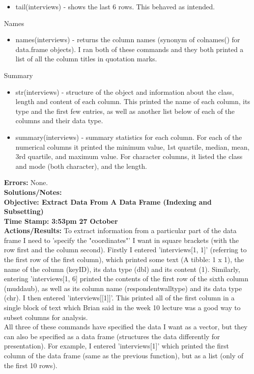 \documentclass{article}
\begin{document}
\begin{FlushLeft}
\begin{itemize}
    \item tail(interviews) - shows the last 6 rows. This behaved as intended.
\end{itemize}
Names
\begin{itemize}
    \item names(interviews) - returns the column names (synonym of colnames() for data.frame objects). I ran both of these commands and they both printed a list of all the column titles in quotation marks.
\end{itemize}
Summary
\begin{itemize}
    \item str(interviews) - structure of the object and information about the class, length and content of each column. This printed the name of each column, its type and the first few entries, as well as another list below of each of the columns and their data type.
    \item summary(interviews) - summary statistics for each column. For each of the numerical columns it printed the minimum value, 1st quartile, median, mean, 3rd quartile, and maximum value. For character columns, it listed the class and mode (both character), and the length.
\end{itemize}
\textbf{Errors:} None.\\
\textbf{Solutions/Notes:}\\
\vspace{5mm}
\textbf{Objective: Extract Data From A Data Frame (Indexing and Subsetting)}\\ 
\textbf{Time Stamp: 3:53pm 27 October} \\
\textbf{Actions/Results:} To extract information from a particular part of the data frame I need to 'specify the "coordinates"' I want in square brackets (with the row first and the column second). Firstly I entered 'interviews[1, 1]' (referring to the first row of the first column), which printed some text (A tibble: 1 x 1), the name of the column (key\textunderscore ID), its data type (dbl) and its content (1). Similarly, entering 'interviews[1, 6] printed the contents of the first row of the sixth column (muddaub), as well as its column name (respondent\textunderscore wall\textunderscore type) and its data type (chr). I then entered 'interviews[[1]]'. This printed all of the first column in a single block of text which Brian said in the week 10 lecture was a good way to subset columns for analysis.\\
All three of these commands have specified the data I want as a vector, but they can also be specified as a data frame (structures the data differently for presentation). For example, I entered 'interviews[1]' which printed the first column of the data frame (same as the previous function), but as a list (only of the first 10 rows).\\

\end{FlushLeft}
\end{document}

